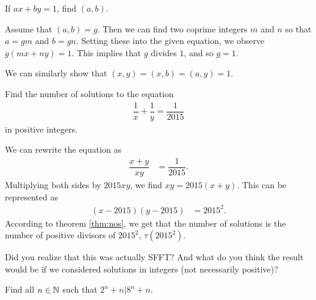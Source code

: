 \documentclass{subfile}
\begin{document}
		\begin{problem}
			If $ax+by=1$, find $(a,b)$.\label{prob:d1}
		\end{problem}

		\begin{solution}
			Assume that $(a,b)=g$. Then we can find two coprime integers $m$ and $n$ so that $a=gm$ and $b=gn$. Setting these into the given equation, we observe $g(mx+ny)=1$. This implies that $g$ divides $1$, and so $g=1$.
		\end{solution}

		\begin{note}
			We can similarly show that $(x,y)=(x,b)=(a,y)=1$.
		\end{note}

		\begin{problem}
			Find the number of solutions to the equation
			\begin{align*}
				\dfrac{1}{x}+\dfrac{1}{y}=\dfrac{1}{2015}
			\end{align*}
			in positive integers.
		\end{problem}

		\begin{solution}
			We can rewrite the equation as
				\begin{align*}
					\dfrac{x+y}{xy} & = \dfrac{1}{2015}.
				\end{align*}
			Multiplying both sides by $2015xy$, we find $xy=2015(x+y)$. This can be represented as
				\begin{align*}
					(x-2015)(y-2015) & = 2015^2.
				\end{align*}
			According to theorem \eqref{thm:nos}, we get that the number of solutions is the number of positive divisors of $2015^2$, $\tau(2015^2)$.
		\end{solution}

		\begin{note}
			Did you realize that this was actually SFFT? And what do you think the result would be if we considered solutions in integers (not necessarily positive)?
		\end{note}

		\begin{problem}
			Find all $n\in\mathbb{N}$ such that $2^n+n|8^n+n$.
		\end{problem}
\end{document}

